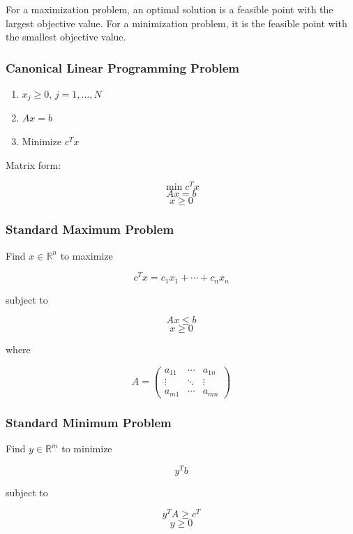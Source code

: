 \begin{Def}  
For a maximization problem, an optimal solution is a feasible point with the largest objective value.  
For a minimization problem, it is the feasible point with the smallest objective value.
\end{Def}

\subsubsection*{Canonical Linear Programming Problem}

\begin{Def}

\begin{enumerate}
\item $x_j \ge 0$, $j = 1,\dots,N$
\item $Ax = b$
\item Minimize $c^T x$
\end{enumerate}

Matrix form:

\[
\min c^T x
\]
\[
Ax = b
\]
\[
x \ge 0
\]
\end{Def}

\subsubsection*{Standard Maximum Problem}

Find $x \in \mathbb{R}^n$ to maximize

\[
c^T x = c_1x_1 + \cdots + c_n x_n
\]

subject to

\[
Ax \le b
\]
\[
x \ge 0
\]

where

\[
A =
\begin{pmatrix}
a_{11} & \cdots & a_{1n} \\
\vdots & \ddots & \vdots \\
a_{m1} & \cdots & a_{mn}
\end{pmatrix}
\]

\subsubsection*{Standard Minimum Problem}

Find $y \in \mathbb{R}^m$ to minimize

\[
y^T b
\]

subject to

\[
y^T A \ge c^T
\]
\[
y \ge 0
\]


